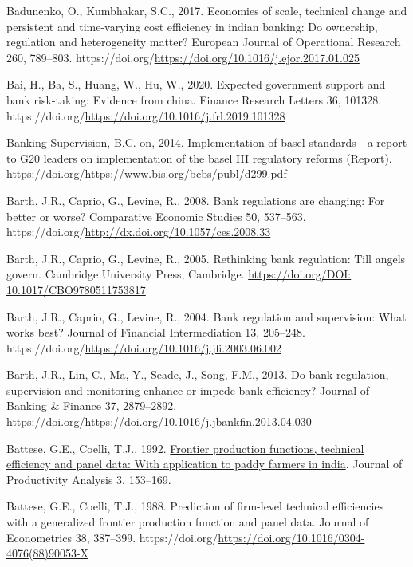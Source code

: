 \documentclass[
  12pt,
  a4paper,
]{scrreprt}
\newlength{\cslhangindent}
\newenvironment{CSLReferences}[2] %
 {\begin{list}{}{%
  \setlength{\itemindent}{0pt}
  \setlength{\leftmargin}{0pt}
  \setlength{\parsep}{0pt}
  \ifodd #1
   \setlength{\leftmargin}{\cslhangindent}
   \setlength{\itemindent}{-1\cslhangindent}
  \fi
  \setlength{\itemsep}{#2\baselineskip}}}
 {\end{list}}
\begin{document}
{{{{\begin{CSLReferences}{1}{0}
Badunenko, O., Kumbhakar, S.C., 2017. Economies of scale, technical
change and persistent and time-varying cost efficiency in indian
banking: Do ownership, regulation and heterogeneity matter? European
Journal of Operational Research 260, 789--803.
https://doi.org/\url{https://doi.org/10.1016/j.ejor.2017.01.025}

Bai, H., Ba, S., Huang, W., Hu, W., 2020. Expected government support
and bank risk-taking: Evidence from china. Finance Research Letters 36,
101328. https://doi.org/\url{https://doi.org/10.1016/j.frl.2019.101328}

Banking Supervision, B.C. on, 2014. Implementation of basel standards -
a report to G20 leaders on implementation of the basel III regulatory
reforms (Report).
https://doi.org/\url{https://www.bis.org/bcbs/publ/d299.pdf}

Barth, J.R., Caprio, G., Levine, R., 2008. Bank regulations are
changing: For better or worse? Comparative Economic Studies 50,
537--563. https://doi.org/\url{http://dx.doi.org/10.1057/ces.2008.33}

Barth, J.R., Caprio, G., Levine, R., 2005. Rethinking bank regulation:
Till angels govern. Cambridge University Press, Cambridge.
\href{https://doi.org/DOI:\%2010.1017/CBO9780511753817}{https://doi.org/DOI:
10.1017/CBO9780511753817}

Barth, J.R., Caprio, G., Levine, R., 2004. Bank regulation and
supervision: What works best? Journal of Financial Intermediation 13,
205--248.
https://doi.org/\url{https://doi.org/10.1016/j.jfi.2003.06.002}

Barth, J.R., Lin, C., Ma, Y., Seade, J., Song, F.M., 2013. Do bank
regulation, supervision and monitoring enhance or impede bank
efficiency? Journal of Banking \& Finance 37, 2879--2892.
https://doi.org/\url{https://doi.org/10.1016/j.jbankfin.2013.04.030}

Battese, G.E., Coelli, T.J., 1992.
\href{http://www.jstor.org/stable/41770578}{Frontier production
functions, technical efficiency and panel data: With application to
paddy farmers in india}. Journal of Productivity Analysis 3, 153--169.

Battese, G.E., Coelli, T.J., 1988. Prediction of firm-level technical
efficiencies with a generalized frontier production function and panel
data. Journal of Econometrics 38, 387--399.
https://doi.org/\url{https://doi.org/10.1016/0304-4076(88)90053-X}


\end{CSLReferences}}}}}
\end{document}
